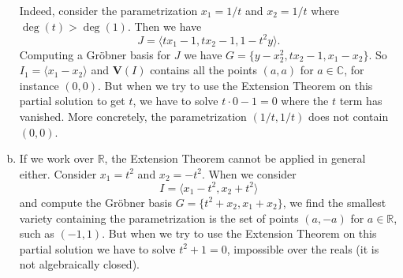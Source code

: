 \documentclass{homework}
\newcommand{\id}[1]{\langle #1 \rangle}
\newcommand{\V}{\mathbf{V}}
\renewcommand{\deg}[1]{\operatorname{deg}(#1)}
\begin{document}
\begin{enumerate}[(a)]
        Indeed, consider the parametrization $x_1 = 1/t$ and $x_2 = 1/t$ where $\deg{t} > \deg{1}$. Then we have
        \[J = \id{tx_1 - 1, tx_2 - 1, 1 - t^2y}.\]
        Computing a Gr\"obner basis for $J$ we have $G = \{y-x_2^2, tx_2-1, x_1-x_2\}$. So $I_1 = \id{x_1 - x_2}$ and $\V(I)$ contains all the points $(a, a)$ for $a \in \mathbb C$, for instance $(0, 0)$. But when we try to use the Extension Theorem on this partial solution to get $t$, we have to solve $t \cdot 0 - 1 = 0$ where the $t$ term has vanished. More concretely, the parametrization $(1/t, 1/t)$ does not contain $(0, 0)$.
        
        \item If we work over $\mathbb R$, the Extension Theorem cannot be applied in general either. Consider $x_1 = t^2$ and $x_2 = -t^2$. When we consider
        \[I = \id{x_1 - t^2, x_2 + t^2}\]
        and compute the Gr\"obner basis $G = \{t^2 + x_2, x_1 + x_2\}$, we find the smallest variety containing the parametrization is the set of points $(a, -a)$ for $a \in \mathbb R$, such as $(-1, 1)$. But when we try to use the Extension Theorem on this partial solution we have to solve $t^2 + 1 = 0$, impossible over the reals (it is not algebraically closed).
    \end{enumerate}
\end{document}

